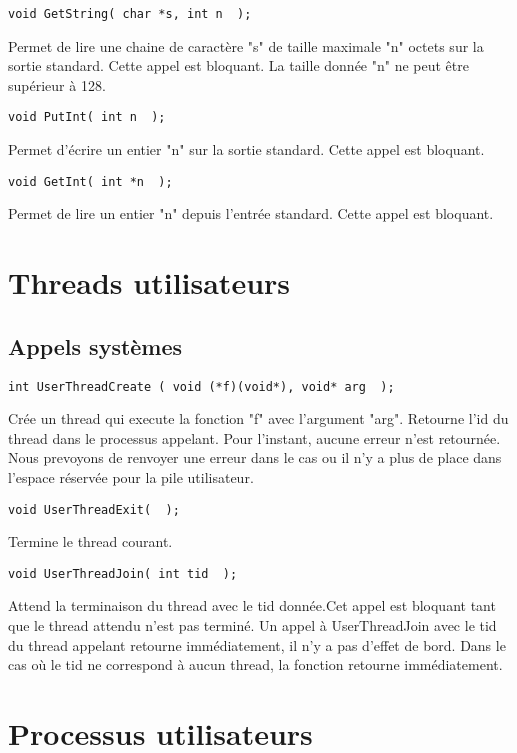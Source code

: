 \documentclass{report}
\begin{document}
\begin{verbatim}
void GetString( char *s, int n  );
\end{verbatim}
Permet de lire une chaine de caractère "s" de taille  maximale "n" octets sur la sortie standard. Cette appel est bloquant. La taille donnée "n" ne peut être supérieur à 128.

\begin{verbatim}
void PutInt( int n  );
\end{verbatim}
Permet d'écrire un entier  "n" sur la sortie standard. Cette appel est bloquant.


\begin{verbatim}
void GetInt( int *n  );
\end{verbatim}
Permet de lire un entier  "n" depuis l'entrée standard. Cette appel est bloquant.

\section{Threads utilisateurs}

\subsection{Appels systèmes}

\begin{verbatim}
int UserThreadCreate ( void (*f)(void*), void* arg  );
\end{verbatim}
Crée un thread qui execute la fonction "f" avec l'argument "arg". Retourne l'id du thread dans le processus appelant. Pour l'instant, aucune erreur n'est retournée. Nous prevoyons de renvoyer une erreur dans le cas ou il n'y a plus de place dans l'espace réservée pour la pile utilisateur.

\begin{verbatim}
void UserThreadExit(  );
\end{verbatim}
Termine le thread courant.

\begin{verbatim}
void UserThreadJoin( int tid  );
\end{verbatim}
Attend la terminaison du thread avec le tid donnée.Cet appel est bloquant tant que le thread attendu n'est pas terminé.  Un appel à UserThreadJoin avec le tid du thread appelant retourne immédiatement, il n'y a pas d'effet de bord. Dans le cas où le tid ne correspond à aucun thread, la fonction retourne immédiatement. 

\section{Processus utilisateurs}
\end{document}
